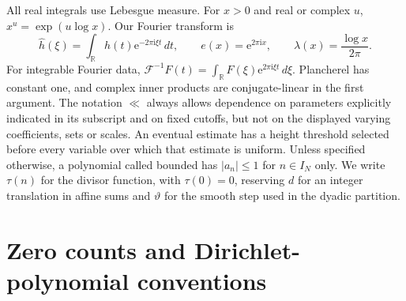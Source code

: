 \documentclass[11pt,a4paper,oneside]{article}
\theoremstyle{definition}
\newcommand{\R}{\mathbb R}
\newcommand{\ii}{\mathrm i}
\newcommand{\e}{\mathrm e}
\numberwithin{equation}{section}
\begin{document}
All real integrals use Lebesgue measure. For $x>0$ and real or complex $u$, $x^u=\exp(u\log x)$. Our Fourier transform is
\[
 \widehat h(\xi)=\int_\R h(t)\e^{-2\pi\ii\xi t}\,dt,
 \qquad e(x)=\e^{2\pi\ii x},\qquad\lambda(x)=\frac{\log x}{2\pi}.
\]
For integrable Fourier data, $\mathcal F^{-1}F(t)=\int_\R F(\xi)\e^{2\pi\ii\xi t}\,d\xi$. Plancherel has constant one, and complex inner products are conjugate-linear in the first argument. The notation $\ll$ always allows dependence on parameters explicitly indicated in its subscript and on fixed cutoffs, but not on the displayed varying coefficients, sets or scales. An eventual estimate has a height threshold selected before every variable over which that estimate is uniform. Unless specified otherwise, a polynomial called bounded has $|a_n|\le1$ for $n\in I_N$ only. We write $\tau(n)$ for the divisor function, with $\tau(0)=0$, reserving $d$ for an integer translation in affine sums and $\vartheta$ for the smooth step used in the dyadic partition.

\section{Zero counts and Dirichlet-polynomial conventions}\label{ch:objects}
\end{document}
